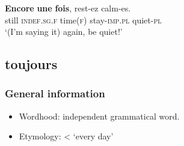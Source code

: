 \begin{exe}
	\ex
	\gll \textbf{Encore} \textbf{une} \textbf{fois}, rest-ez calm-es.\\
	still \textsc{indef}.\textsc{sg}.\textsc{f} time(\textsc{f}) stay-\textsc{imp}.\textsc{pl} quiet-\textsc{pl}\\
	\glt \lq(I'm saying it) again, be quiet!\rq{ }\parencite[51 fn11]{Borillo1984}
\end{exe}
\largerpage
\subsection{toujours}
\subsubsection{General information}
\begin{itemize}
		\item Wordhood: independent grammatical word.
		\item Etymology: < \lq every day\rq{}
\end{itemize}

